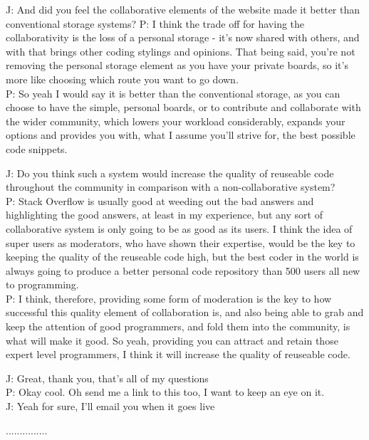 J: \-\hspace{1.4cm}And did you feel the collaborative elements of the website made it better than conventional storage systems?
P: I think the trade off for having the collaborativity is the loss of a personal storage - it's now shared with others, and with that brings other coding stylings and opinions. That being said, you're not removing the personal storage element as you have your private boards, so it's more like choosing which route you want to go down.  \\
P: So yeah I would say it is better than the conventional storage, as you can choose to have the simple, personal boards, or to contribute and collaborate with the wider community, which lowers your workload considerably, expands your options and provides you with, what I assume you'll strive for, the best possible code snippets.

J: \-\hspace{1.4cm}Do you think such a system would increase the quality of reuseable code throughout the community in comparison with a non-collaborative system? \\
P: Stack Overflow is usually good at weeding out the bad answers and highlighting the good answers, at least in my experience, but any sort of collaborative system is only going to be as good as its users. I think the idea of super users as moderators, who have shown their expertise, would be the key to keeping the quality of the reuseable code high, but the best coder in the world is always going to produce a better personal code repository than 500 users all new to programming.  \\
P: I think, therefore, providing some form of moderation is the key to how successful this quality element of collaboration is, and also being able to grab and keep the attention of good programmers, and fold them into the community, is what will make it good. So yeah, providing you can attract and retain those expert level programmers, I think it will increase the quality of reuseable code.

J: \-\hspace{1.4cm}Great, thank you, that's all of my questions \\
P: Okay cool. Oh send me a link to this too, I want to keep an eye on it. \\
J: \-\hspace{1.4cm}Yeah for sure, I'll email you when it goes live

...............


